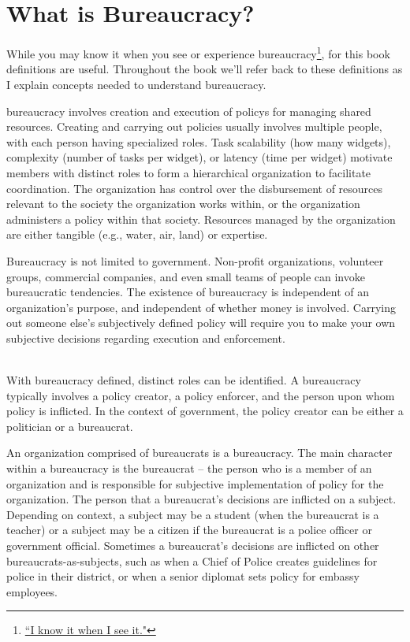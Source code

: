 \section{What is Bureaucracy?\label{sec:define-bureaucracy}}

While you may know it when you see or experience bureaucracy\footnote{\href{https://en.wikipedia.org/wiki/I_know_it_when_I_see_it}{``I know it when I see it."}}, for this book definitions are useful. Throughout the book we'll refer back to these definitions as I explain concepts needed to understand bureaucracy.

\Gls{bureaucracy} involves creation and execution of \glspl{policy} for managing shared resources. Creating and carrying out policies usually involves multiple people, with each person having specialized roles. Task scalability (how many widgets), complexity (number of tasks per widget), or latency (time per widget) motivate members with distinct roles to form a hierarchical organization to facilitate coordination. The organization has control over the disbursement of resources relevant to the society the organization works within, or the organization administers a policy within that society. Resources managed by the organization are either tangible (e.g., water, air, land) or expertise.  

Bureaucracy is not limited to government. Non-profit organizations, volunteer groups, commercial companies, and even small teams of people can invoke bureaucratic tendencies. The existence of bureaucracy is independent of an organization's purpose, and independent of whether money is involved. Carrying out someone else's subjectively defined policy will require you to make your own subjective decisions regarding execution and enforcement. 

\ \\

With bureaucracy defined, distinct roles can be identified.
A bureaucracy typically involves a policy creator, a policy enforcer, and the person upon whom policy is inflicted. In the context of government, the policy creator can be either a politician or a bureaucrat. 

An organization comprised of bureaucrats is a \gls{bureaucracy}. The main character within a bureaucracy is the \gls{bureaucrat} -- the person who is a member of an organization and is responsible for subjective implementation of policy for the organization. The person that a bureaucrat's decisions are inflicted on a \gls{subject}.  Depending on context, a subject may be a student (when the bureaucrat is a teacher) or a subject may be a citizen if the bureaucrat is a police officer or government official. Sometimes a bureaucrat's decisions are inflicted on other bureaucrats-as-subjects, such as when a Chief of Police creates guidelines for police in their district, or when a senior diplomat sets policy for embassy employees. 


